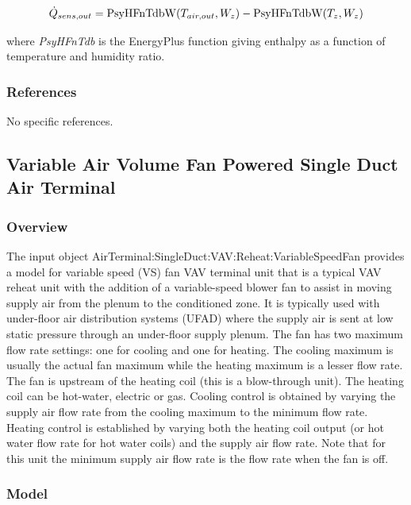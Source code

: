 \begin{equation}
{\dot Q_{sens,out}} = {\rm{PsyHFnTdbW}}({T_{air,out}},{W_z}) - {\rm{PsyHFnTdbW(}}{T_z},{W_z})
\end{equation}

where \emph{PsyHFnTdb} is the EnergyPlus function giving enthalpy as a function of temperature and humidity ratio.

\subsubsection{References}\label{references-2}

No specific references.

\subsection{Variable Air Volume Fan Powered Single Duct Air Terminal}\label{variable-air-volume-fan-powered-single-duct-air-terminal}

\subsubsection{Overview}\label{overview-2-000}

The input object AirTerminal:SingleDuct:VAV:Reheat:VariableSpeedFan provides a model for variable speed (VS) fan VAV terminal unit that is a typical VAV reheat unit with the addition of a variable-speed blower fan to assist in moving supply air from the plenum to the conditioned zone. It is typically used with under-floor air distribution systems (UFAD) where the supply air is sent at low static pressure through an under-floor supply plenum. The fan has two maximum flow rate settings: one for cooling and one for heating. The cooling maximum is usually the actual fan maximum while the heating maximum is a lesser flow rate. The fan is upstream of the heating coil (this is a blow-through unit). The heating coil can be hot-water, electric or gas. Cooling control is obtained by varying the supply air flow rate from the cooling maximum to the minimum flow rate. Heating control is established by varying both the heating coil output (or hot water flow rate for hot water coils) and the supply air flow rate. Note that for this unit the minimum supply air flow rate is the flow rate when the fan is off.

\subsubsection{Model}\label{model-2}

